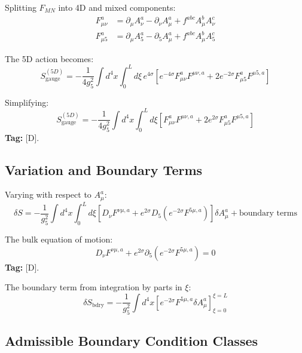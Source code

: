 \documentclass[11pt,a4paper]{article}
\begin{document}
Splitting $F_{MN}$ into 4D and mixed components:
\begin{align}
  F_{\mu\nu}^a &= \partial_\mu A_\nu^a - \partial_\nu A_\mu^a + f^{abc} A_\mu^b A_\nu^c
  \label{eq:Fmunu} \\
  F_{\mu 5}^a &= \partial_\mu A_5^a - \partial_5 A_\mu^a + f^{abc} A_\mu^b A_5^c
  \label{eq:Fmu5}
\end{align}

The 5D action becomes:
\begin{equation}
  S_{\text{gauge}}^{(5D)} = -\frac{1}{4g_5^2} \int d^4x \int_0^L d\xi \, e^{4\sigma}
    \left[ e^{-4\sigma} F_{\mu\nu}^a F^{\mu\nu,a} + 2 e^{-2\sigma} F_{\mu 5}^a F^{\mu 5,a} \right]
  \label{eq:action-decomposed}
\end{equation}

Simplifying:
\begin{equation}
  S_{\text{gauge}}^{(5D)} = -\frac{1}{4g_5^2} \int d^4x \int_0^L d\xi
    \left[ F_{\mu\nu}^a F^{\mu\nu,a} + 2 e^{2\sigma} F_{\mu 5}^a F^{\mu 5,a} \right]
  \label{eq:action-simplified}
\end{equation}
\textbf{Tag:} [D].

\subsection{Variation and Boundary Terms}

Varying with respect to $A_\mu^a$:
\begin{equation}
  \delta S = -\frac{1}{g_5^2} \int d^4x \int_0^L d\xi \left[
    D_\nu F^{\nu\mu,a} + e^{2\sigma} D_5 (e^{-2\sigma} F^{5\mu,a})
  \right] \delta A_\mu^a + \text{boundary terms}
  \label{eq:variation}
\end{equation}

The bulk equation of motion:
\begin{equation}
  \boxed{D_\nu F^{\nu\mu,a} + e^{2\sigma} \partial_5 (e^{-2\sigma} F^{5\mu,a}) = 0}
  \label{eq:bulk-eom}
\end{equation}
\textbf{Tag:} [D].

The boundary term from integration by parts in $\xi$:
\begin{equation}
  \delta S_{\text{bdry}} = -\frac{1}{g_5^2} \int d^4x \left[
    e^{-2\sigma} F^{5\mu,a} \delta A_\mu^a \right]_{\xi=0}^{\xi=L}
  \label{eq:boundary-term}
\end{equation}

\subsection{Admissible Boundary Condition Classes}
\end{document}
